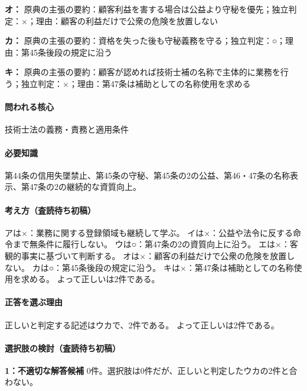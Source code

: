 \noindent\textbf{オ：} 原典の主張の要約：顧客利益を害する場合は公益より守秘を優先；独立判定：×；理由：顧客の利益だけで公衆の危険を放置しない\par

\noindent\textbf{カ：} 原典の主張の要約：資格を失った後も守秘義務を守る；独立判定：○；理由：第45条後段の規定に沿う\par

\noindent\textbf{キ：} 原典の主張の要約：顧客が認めれば技術士補の名称で主体的に業務を行う；独立判定：×；理由：第47条は補助としての名称使用を求める\par

\paragraph{問われる核心} 技術士法の義務・責務と適用条件

\paragraph{必要知識} 第44条の信用失墜禁止、第45条の守秘、第45条の2の公益、第46・47条の名称表示、第47条の2の継続的な資質向上。

\paragraph{考え方（査読待ち初稿）} アは×：業務に関する登録領域も継続して学ぶ。 イは×：公益や法令に反する命令まで無条件に履行しない。 ウは○：第47条の2の資質向上に沿う。 エは×：客観的事実に基づいて判断する。 オは×：顧客の利益だけで公衆の危険を放置しない。 カは○：第45条後段の規定に沿う。 キは×：第47条は補助としての名称使用を求める。 よって正しいは2件である。

\paragraph{正答を選ぶ理由} 正しいと判定する記述はウカで、2件である。  よって正しいは2件である。

\paragraph{選択肢の検討（査読待ち初稿）}\mbox{}\par

\noindent\textbf{1：不適切な解答候補} 0件。選択肢は0件だが、正しいと判定したウカの2件と合わない。\par

